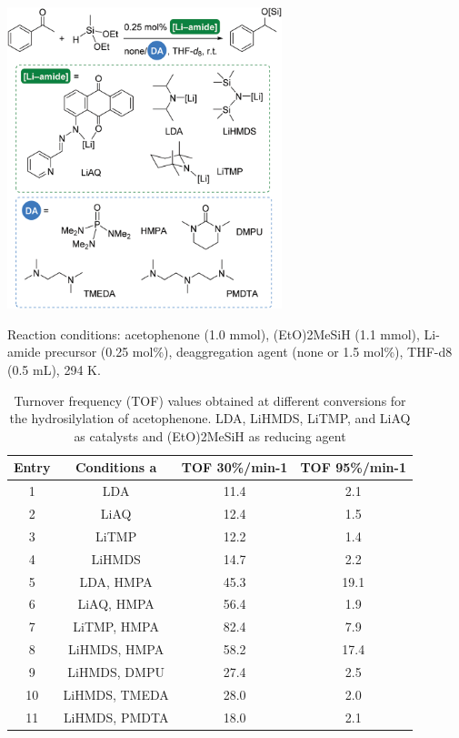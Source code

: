 \documentclass[journal=jacsat,manuscript=article]{achemso}
\begin{document}
	\begin{scheme}[H]
		\includegraphics[width=0.6\textwidth]{figures/Reaction.PNG}		
		\centering
		\caption{Reaction conditions: acetophenone (1.0 mmol), (EtO)2MeSiH (1.1 mmol), Li-amide precursor (0.25 mol\%), deaggregation
			agent (none or 1.5 mol\%), THF-d8 (0.5 mL), 294 K.}
		\label{Scheme5}
	\end{scheme}
	
	\begin{table}
		\caption{Turnover frequency (TOF) values obtained at different conversions for the hydrosilylation of acetophenone. LDA, LiHMDS, LiTMP, and LiAQ as catalysts and (EtO)2MeSiH as reducing agent}
		\begin{tabular}{|c|c|c|c}
			\hline
			Entry & Conditions a & TOF 30\%/min-1 & TOF 95\%/min-1 \\
			\hline
			1 & LDA & 11.4 & 2.1 \\
			\hline
			2 & LiAQ & 12.4 & 1.5 \\
			\hline
			3 & LiTMP & 12.2 & 1.4 \\
			\hline
			4 & LiHMDS & 14.7 & 2.2 \\
			\hline
			5 & LDA, HMPA & 45.3 & 19.1 \\
			\hline
			6 & LiAQ, HMPA & 56.4 & 1.9 \\
			\hline
			7 & LiTMP, HMPA & 82.4 & 7.9 \\
			\hline
			8 & LiHMDS, HMPA & 58.2 & 17.4 \\
			\hline
			9 & LiHMDS, DMPU & 27.4 & 2.5 \\
			\hline
			10 & LiHMDS, TMEDA & 28.0 & 2.0 \\
			\hline
			11 & LiHMDS, PMDTA & 18.0 & 2.1 \\
			\hline
		\end{tabular}
	\end{table}
	
\end{document}
